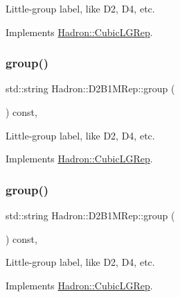 Little-\/group label, like D2, D4, etc. 

Implements \mbox{\hyperlink{structHadron_1_1CubicLGRep_a9bdb14b519a611d21379ed96a3a9eb41}{Hadron\+::\+Cubic\+L\+G\+Rep}}.

\mbox{\label{structHadron_1_1D2B1MRep_a7857a8d3cbac3930e53e1e9fa474a478}} 
\subsubsection{\texorpdfstring{group()}{group()}\hspace{0.1cm}{\footnotesize\ttfamily [2/3]}}
{\footnotesize\ttfamily std\+::string Hadron\+::\+D2\+B1\+M\+Rep\+::group (\begin{DoxyParamCaption}{ }\end{DoxyParamCaption}) const\hspace{0.3cm}{\ttfamily [inline]}, {\ttfamily [virtual]}}

Little-\/group label, like D2, D4, etc. 

Implements \mbox{\hyperlink{structHadron_1_1CubicLGRep_a9bdb14b519a611d21379ed96a3a9eb41}{Hadron\+::\+Cubic\+L\+G\+Rep}}.

\mbox{\label{structHadron_1_1D2B1MRep_a7857a8d3cbac3930e53e1e9fa474a478}} 
\subsubsection{\texorpdfstring{group()}{group()}\hspace{0.1cm}{\footnotesize\ttfamily [3/3]}}
{\footnotesize\ttfamily std\+::string Hadron\+::\+D2\+B1\+M\+Rep\+::group (\begin{DoxyParamCaption}{ }\end{DoxyParamCaption}) const\hspace{0.3cm}{\ttfamily [inline]}, {\ttfamily [virtual]}}

Little-\/group label, like D2, D4, etc. 

Implements \mbox{\hyperlink{structHadron_1_1CubicLGRep_a9bdb14b519a611d21379ed96a3a9eb41}{Hadron\+::\+Cubic\+L\+G\+Rep}}.

\mbox{\label{structHadron_1_1D2B1MRep_acdc6dd62590a2ab336e6f7669c63ed3f}} 
